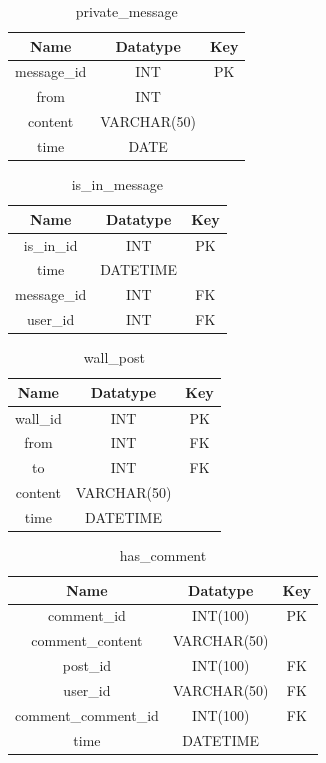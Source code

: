 \begin{table}[!ht]
\caption{private\_message}
\centering
\begin{tabular}{c c c}
\hline\hline
Name               & Datatype    & Key \\
\hline
message\_id        & INT         & PK  \\
from               & INT         &     \\
content            & VARCHAR(50) &     \\
time               & DATE        &     \\
\hline
\end{tabular}
\label{table:nonlin}
\end{table}

\begin{table}[!ht]
\caption{is\_in\_message}
\centering
\begin{tabular}{c c c}
\hline\hline
Name               & Datatype        & Key \\
\hline
is\_in\_id         & INT             & PK  \\
time               & DATETIME        &     \\
message\_id        & INT             & FK  \\
user\_id           & INT             & FK  \\
\hline
\end{tabular}
\label{table:nonlin}
\end{table}

\begin{table}[!ht]
\caption{wall\_post}
\centering
\begin{tabular}{c c c}
\hline\hline
Name                    & Datatype    & Key \\
\hline
wall\_id                & INT         & PK  \\
from                    & INT         & FK  \\
to                      & INT         & FK  \\
content                 & VARCHAR(50) &     \\
time                    & DATETIME    &     \\
\hline
\end{tabular}
\label{table:nonlin}
\end{table}

\begin{table}[!ht]
\caption{has\_comment}
\centering
\begin{tabular}{c c c}
\hline\hline
Name                 & Datatype     & Key \\
\hline
comment\_id          & INT(100)     & PK  \\
comment\_content     & VARCHAR(50)  &     \\
post\_id             & INT(100)     & FK  \\
user\_id             & VARCHAR(50)  & FK  \\
comment\_comment\_id & INT(100)     & FK   \\
time                 & DATETIME     &     \\
\hline
\end{tabular}
\label{table:nonlin}
\end{table}

